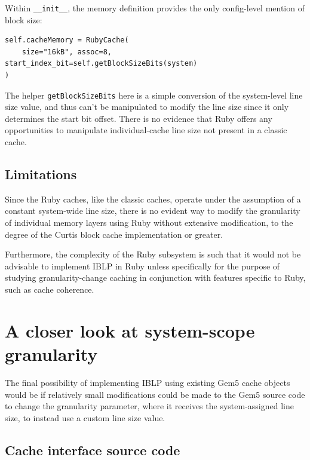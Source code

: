\documentclass[12pt,twoside]{reedthesis}
\begin{document}
	Within \verb`__init__`, the memory definition provides the only config-level mention of block size: \begin{verbatim}
self.cacheMemory = RubyCache(
    size="16kB", assoc=8, start_index_bit=self.getBlockSizeBits(system)
)\end{verbatim}

	The helper \verb`getBlockSizeBits` here is a simple conversion of the system-level line size value, and thus can't be manipulated to modify the line size since it only determines the start bit offset. There is no evidence that Ruby offers any opportunities to manipulate individual-cache line size not present in a classic cache.

	\subsection*{Limitations}

	Since the Ruby caches, like the classic caches, operate under the assumption of a constant system-wide line size, there is no evident way to modify the granularity of individual memory layers using Ruby without extensive modification, to the degree of the Curtis block cache implementation or greater.

	Furthermore, the complexity of the Ruby subsystem is such that it would not be advisable to implement IBLP in Ruby unless specifically for the purpose of studying granularity-change caching in conjunction with features specific to Ruby, such as cache coherence.

\section{A closer look at system-scope granularity}

	The final possibility of implementing IBLP using existing Gem5 cache objects would be if relatively small modifications could be made to the Gem5 source code to change the granularity parameter, where it receives the system-assigned line size, to instead use a custom line size value.

	\subsection*{Cache interface source code}
\end{document}
